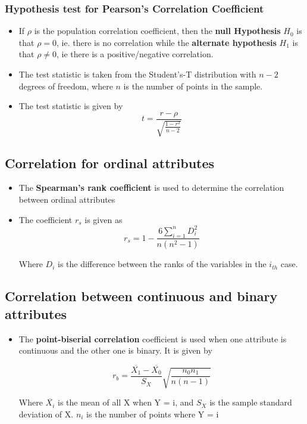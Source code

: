 \documentclass{article}
\theoremstyle{plain}
\theoremstyle{definition}
\begin{document}
\subsubsection{Hypothesis test for Pearson's Correlation Coefficient}
\begin{itemize}
    \item If $\rho$ is the population correlation coefficient, then the \textbf{null Hypothesis} $H_0$ is that $\rho = 0$, ie. there is no correlation while the\textbf{ alternate hypothesis} $H_1$ is that $\rho \neq 0$, ie there is a positive/negative correlation. 
    
    \item The test statistic is taken from the Student's-T distribution with $n-2$ degrees of freedom, where $n$ is the number of points in the sample. 
    
    \item The test statistic is given by
    \begin{equation}
        t  = \frac{r - \rho}{\sqrt{\frac{1 - r^2}{n-2}}}
    \end{equation}
\end{itemize}

\subsection{Correlation for ordinal attributes}
\begin{itemize}
    \item The \textbf{Spearman's rank coefficient} is used to determine the correlation between ordinal attributes
    
    \item The coefficient $r_s$ is given as
    \begin{equation}
        r_s = 1 - \frac{6 \sum\limits_{i=1}^{n} D_i^2}{n (n^2 -1 )}
    \end{equation}
    
    Where $D_i$ is the difference between the ranks of the variables in the $i_{th}$ case. 
\end{itemize}

\subsection{Correlation between continuous and binary attributes}
\begin{itemize}
    \item The \textbf{point-biserial correlation} coefficient is used when one attribute is continuous and the other one is binary. It is given by
    
    \begin{equation}
        r_b = \frac{\overline{X_1} - \overline{X_0}}{S_X} \sqrt{\frac{n_0 n_1}{n(n-1)}}
    \end{equation}
    
    Where $\overline{X_i}$ is the mean of all X when Y = i, and $S_X$ is the sample standard deviation of X. $n_i$ is the number of points where Y = i
\end{itemize}
\end{document}
